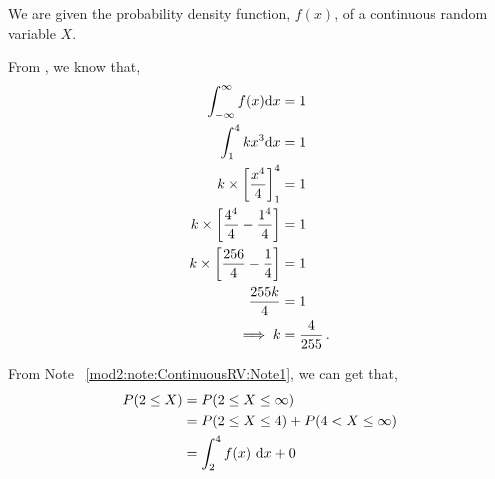 %
%


\begin{subquestions}
	
\subquestion

We are given the probability density function, $f(x)$, of a continuous random variable $X$.

From , we know that,
\begin{align}
	\int_{-\infty}^{\infty} f(x)\mathrm{d}x & = 1 \nonumber \\
	\int_{1}^{4} kx^3\mathrm{d}x & = 1 \nonumber \\
	k \times \left[\frac{x^4}{4}\right]^4_1 & = 1 \nonumber \\
	k \times \left[\frac{4^4}{4} - \frac{1^4}{4} \right] & = 1 \nonumber \\
	k \times \left[\frac{256}{4} - \frac{1}{4} \right] & = 1 \nonumber \\
	\frac{255k}{4} & = 1 \nonumber \\
	\implies k & = \frac{4}{255} \,.
\end{align}


\subquestion

\begin{subsubquestions}
	
\subsubquestion

From Note ~\ref{mod2:note:ContinuousRV:Note1}, we can get that,
\begin{align}
	P(2 \leq X) &= P(2\leq X \leq \infty) \nonumber \\
	 &= P(2 \leq X \leq 4) + P(4 < X \leq \infty)\nonumber\\
	&= \int_2^4 f(x)~\mathrm{d}x + 0
\end{align}



\end{subsubquestions}
\end{subquestions}
